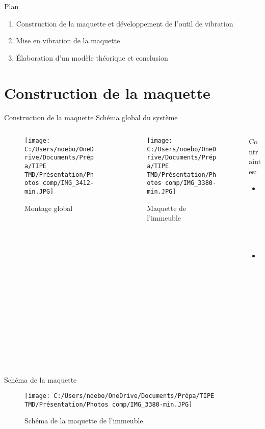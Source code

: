 \documentclass{beamer}
\begin{document}
	\begin{frame}{Plan}
		\begin{enumerate}
			\item\huge{Construction de la maquette et développement de l'outil de vibration} \linebreak
			\item Mise en vibration de la maquette\linebreak
			\item Élaboration d'un modèle théorique et conclusion 
		\end{enumerate}
	\end{frame}
	
	\section{Construction de la maquette}
	\begin{frame}{Construction de la maquette}
		Schéma global du système
		\begin{columns}
			\begin{column}{0.3\textwidth}
				\begin{figure}
					\texttt{[image: C:/Users/noebo/OneDrive/Documents/Prépa/TIPE TMD/Présentation/Photos comp/IMG\_3412-min.JPG]}
					\caption{Montage global}
				\end{figure}
			\end{column}
			\begin{column}{0.3\textwidth}
			
			\begin{figure}
				\texttt{[image: C:/Users/noebo/OneDrive/Documents/Prépa/TIPE TMD/Présentation/Photos comp/IMG\_3380-min.JPG]}
				\caption{Maquette de l'immeuble}
			\end{figure}
			\end{column}
	
		\begin{column}{0.2\textwidth}
				Contraintes:
		\begin{itemize}
			\item Taille
			\item Flexibilité \\
		\end{itemize}
		\end{column}
	\end{columns}
	\end{frame}


\begin{frame}{Schéma de la maquette}
	\begin{figure}
		\texttt{[image: C:/Users/noebo/OneDrive/Documents/Prépa/TIPE TMD/Présentation/Photos comp/IMG\_3380-min.JPG]}
		\caption{Schéma de la maquette de l'immeuble}
	\end{figure}
\end{frame}
\end{document}
